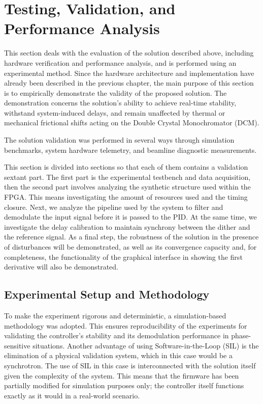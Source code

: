 \chapter{Testing, Validation, and Performance Analysis}\label{chap:Testing, Validation, and Performance Analysis}

This section deals with the evaluation of the solution described above, including hardware verification and performance analysis, and is performed using an experimental method.
Since the hardware architecture and implementation have already been described in the previous chapter, the main purpose of this section is to empirically demonstrate the validity of the proposed solution.
The demonstration concerns the solution's ability to achieve real-time stability, withstand system-induced delays, and remain unaffected by thermal or mechanical frictional shifts acting on the Double Crystal Monochromator (DCM).

The solution validation was performed in several ways through simulation benchmarks, system hardware telemetry, and beamline diagnostic measurements.

This section is divided into sections so that each of them contains a validation sextant part.
The first part is the experimental testbench and data acquisition, then the second part involves analyzing the synthetic structure used within the FPGA. This means investigating the amount of resources used and the timing closure.
Next, we analyze the pipeline used by the system to filter and demodulate the input signal before it is passed to the PID.
At the same time, we investigate the delay calibration to maintain synchrony between the dither and the reference signal.
As a final step, the robustness of the solution in the presence of disturbances will be demonstrated, as well as its convergence capacity and, for completeness, the functionality of the graphical interface in showing the first derivative will also be demonstrated.
\section{Experimental Setup and Methodology}

To make the experiment rigorous and deterministic, a simulation-based methodology was adopted. 
This ensures reproducibility of the experiments for validating the controller's stability and its demodulation performance in phase-sensitive situations.
Another advantage of using Software-in-the-Loop (SIL) is the elimination of a physical validation system, which in this case would be a synchrotron. 
The use of SIL in this case is interconnected with the solution itself given the complexity of the system. This means that the firmware has been partially modified for simulation purposes only; the controller itself functions exactly as it would in a real-world scenario.

